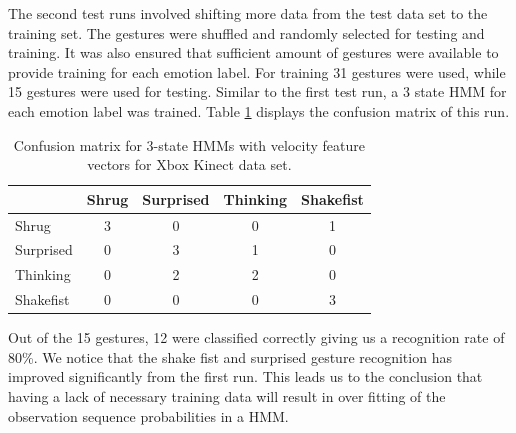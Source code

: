 \documentclass[]{report}   %
\begin{document}
The second test runs involved shifting more data from the test data set to the training set. The gestures were shuffled and randomly selected for testing and training. It was also ensured that sufficient amount of gestures were available to provide training for each emotion label. For training 31 gestures were used, while 15 gestures were used for testing. Similar to the first test run, a 3 state HMM for each emotion label was trained. Table \ref{tab:xboxdim3state2} displays the confusion matrix of this run. 
\begin{table}[htbp]
	\centering
		\begin{tabular}{|l|c|c|c|c|}
		\hline
             & Shrug & Surprised & Thinking & Shakefist \\ \hline
        Shrug 		& 3     & 0    & 0     & 1   \\ \hline
        Surprised 	& 0     & 3    & 1     & 0   \\ \hline
        Thinking 	& 0     & 2    & 2     & 0  \\ \hline
        Shakefist   & 0     & 0    & 0     & 3  \\
		\hline
		\end{tabular}
	\caption{Confusion matrix for 3-state HMMs with velocity feature vectors for Xbox Kinect data set.}
	\label{tab:xboxdim3state2}
\end{table}
Out of the 15 gestures, 12 were classified correctly giving us a recognition rate of 80\%. We notice that the shake fist and surprised gesture recognition has improved significantly from the first run. This leads us to the conclusion that having a lack of necessary training data will result in over fitting of the observation sequence probabilities in a HMM. 
\end{document}
